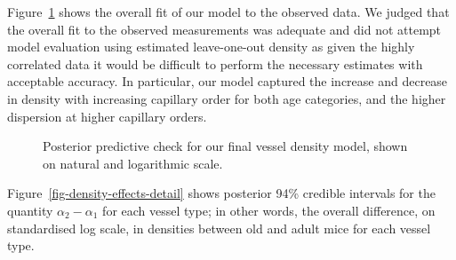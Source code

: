 \documentclass[
  letterpaper,
  DIV=11,
  numbers=noendperiod,
  oneside]{scrartcl}
\theoremstyle{plain}
\theoremstyle{remark}
\begin{document}
Figure~\ref{fig-density-ppc} shows the overall fit of our model to the
observed data. We judged that the overall fit to the observed
measurements was adequate and did not attempt model evaluation using
estimated leave-one-out density as given the highly correlated data it
would be difficult to perform the necessary estimates with acceptable
accuracy. In particular, our model captured the increase and decrease in
density with increasing capillary order for both age categories, and the
higher dispersion at higher capillary orders.

\begin{figure}


\caption{\label{fig-density-ppc}Posterior predictive check for our final
vessel density model, shown on natural and logarithmic scale.}

\end{figure}%

Figure~\ref{fig-density-effects-detail} shows posterior 94\% credible
intervals for the quantity \(\alpha_{2} - \alpha_{1}\) for each vessel
type; in other words, the overall difference, on standardised log scale,
in densities between old and adult mice for each vessel type.
\end{document}

